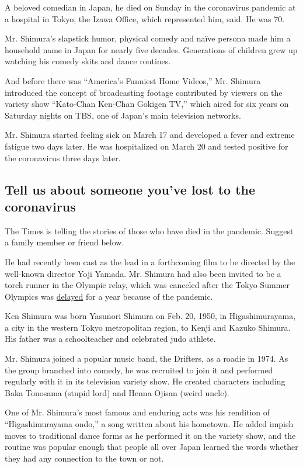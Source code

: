 A beloved comedian in Japan, he died on Sunday in the coronavirus
pandemic at a hospital in Tokyo, the Izawa Office, which represented
him, said. He was 70.

Mr. Shimura's slapstick humor, physical comedy and naïve persona made
him a household name in Japan for nearly five decades. Generations of
children grew up watching his comedy skits and dance routines.

And before there was ``America's Funniest Home Videos,'' Mr. Shimura
introduced the concept of broadcasting footage contributed by viewers on
the variety show ``Kato-Chan Ken-Chan Gokigen TV,'' which aired for six
years on Saturday nights on TBS, one of Japan's main television
networks.

Mr. Shimura started feeling sick on March 17 and developed a fever and
extreme fatigue two days later. He was hospitalized on March 20 and
tested positive for the coronavirus three days later.

\hypertarget{tell-us-about-someone-youve-lost-to-the-coronavirus}{%
\subsection{Tell us about someone you've lost to the
coronavirus}\label{tell-us-about-someone-youve-lost-to-the-coronavirus}}

The Times is telling the stories of those who have died in the pandemic.
Suggest a family member or friend below.

He had recently been cast as the lead in a forthcoming film to be
directed by the well-known director Yoji Yamada. Mr. Shimura had also
been invited to be a torch runner in the Olympic relay, which was
canceled after the Tokyo Summer Olympics was
\href{https://www.nytimes.com/2020/03/24/sports/olympics/coronavirus-summer-olympics-postponed.html}{delayed}
for a year because of the pandemic.

Ken Shimura was born Yasunori Shimura on Feb. 20, 1950, in
Higashimurayama, a city in the western Tokyo metropolitan region, to
Kenji and Kazuko Shimura. His father was a schoolteacher and celebrated
judo athlete.

Mr. Shimura joined a popular music band, the Drifters, as a roadie in
1974. As the group branched into comedy, he was recruited to join it and
performed regularly with it in its television variety show. He created
characters including Baka Tonosama (stupid lord) and Henna Ojisan (weird
uncle).

One of Mr. Shimura's most famous and enduring acts was his rendition of
``Higashimurayama ondo,'' a song written about his hometown. He added
impish moves to traditional dance forms as he performed it on the
variety show, and the routine was popular enough that people all over
Japan learned the words whether they had any connection to the town or
not.

